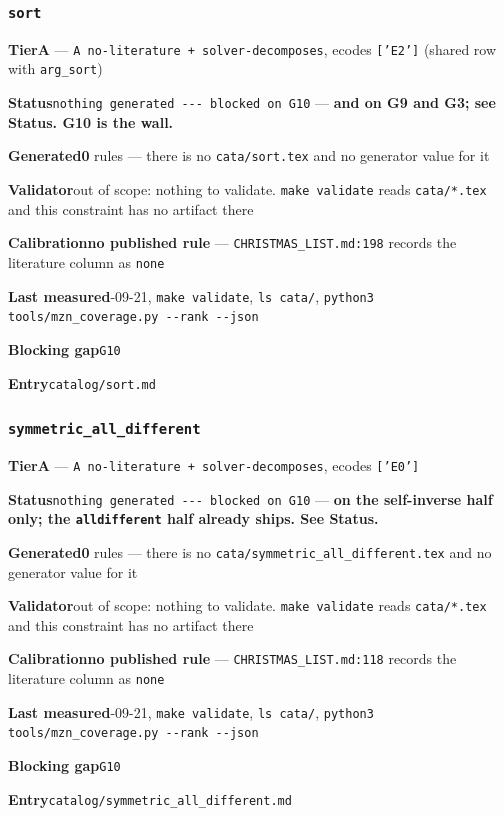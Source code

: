 \documentclass[10pt,a4paper]{article}
\newcommand{\entryfield}[2]{{\raggedright\textbf{#1}\quad #2\par}}
\begin{document}
\subsubsection*{\texttt{sort}}
\label{entry:sort}
\entryfield{Tier}{\textbf{A} --- \texttt{A no-\allowbreak{}literature + solver-\allowbreak{}decomposes}, ecodes \texttt{['E2']} (shared row with \texttt{arg\_sort})}
\entryfield{Status}{\texttt{nothing generated -\allowbreak{}-\allowbreak{}-\allowbreak{} blocked on G10} --- \textbf{and on G9 and G3; see Status. G10 is the wall.}}
\entryfield{Generated}{\textbf{0} rules --- there is no \texttt{cata/sort.tex} and no generator value for it}
\entryfield{Validator}{out of scope: nothing to validate. \texttt{make validate} reads \texttt{cata/*.tex} and this constraint has no artifact there}
\entryfield{Calibration}{\textbf{no published rule} --- \texttt{CHRISTMAS\_LIST.md:198} records the literature column as \texttt{none}}
\entryfield{Last measured}{2026-09-21, \texttt{make validate}, \texttt{ls cata/}, \texttt{python3 tools/\allowbreak{}mzn\_\allowbreak{}coverage.\allowbreak{}py -\allowbreak{}-\allowbreak{}rank -\allowbreak{}-\allowbreak{}json}}
\entryfield{Blocking gap}{\texttt{G10}}
\entryfield{Entry}{\texttt{catalog/sort.md}}
\subsubsection*{\texttt{symmetric\_\allowbreak{}all\_\allowbreak{}different}}
\label{entry:symmetric-all-different}
\entryfield{Tier}{\textbf{A} --- \texttt{A no-\allowbreak{}literature + solver-\allowbreak{}decomposes}, ecodes \texttt{['E0']}}
\entryfield{Status}{\texttt{nothing generated -\allowbreak{}-\allowbreak{}-\allowbreak{} blocked on G10} --- \textbf{on the self-inverse half only; the \texttt{alldifferent} half already ships. See Status.}}
\entryfield{Generated}{\textbf{0} rules --- there is no \texttt{cata/\allowbreak{}symmetric\_\allowbreak{}all\_\allowbreak{}different.\allowbreak{}tex} and no generator value for it}
\entryfield{Validator}{out of scope: nothing to validate. \texttt{make validate} reads \texttt{cata/*.tex} and this constraint has no artifact there}
\entryfield{Calibration}{\textbf{no published rule} --- \texttt{CHRISTMAS\_LIST.md:118} records the literature column as \texttt{none}}
\entryfield{Last measured}{2026-09-21, \texttt{make validate}, \texttt{ls cata/}, \texttt{python3 tools/\allowbreak{}mzn\_\allowbreak{}coverage.\allowbreak{}py -\allowbreak{}-\allowbreak{}rank -\allowbreak{}-\allowbreak{}json}}
\entryfield{Blocking gap}{\texttt{G10}}
\entryfield{Entry}{\texttt{catalog/symmetric\_all\_different.md}}
\end{document}
